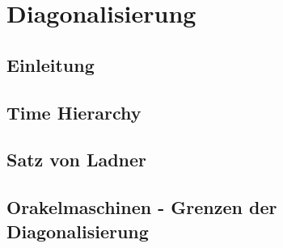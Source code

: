 \section{Diagonalisierung}
\subsection[Einleitung]{Einleitung}


\subsection[Time Hierarchy]{Time Hierarchy}

\subsection[Satz von Ladner]{Satz von Ladner}

\subsection[Orakelmaschinen]{Orakelmaschinen - Grenzen der Diagonalisierung}
